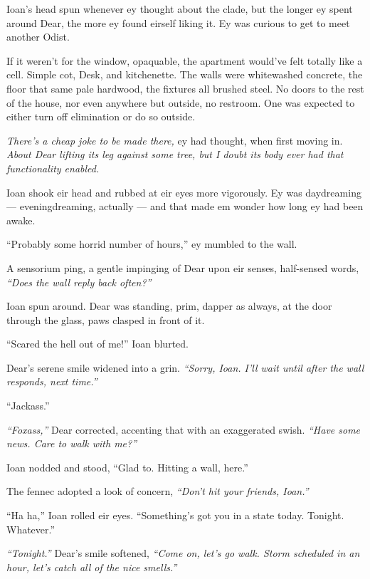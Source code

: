 Ioan's head spun whenever ey thought about the clade, but the longer ey spent around Dear, the more ey found eirself liking it. Ey was curious to get to meet another Odist.

If it weren't for the window, opaquable, the apartment would've felt totally like a cell. Simple cot, Desk, and kitchenette. The walls were whitewashed concrete, the floor that same pale hardwood, the fixtures all brushed steel. No doors to the rest of the house, nor even anywhere but outside, no restroom. One was expected to either turn off elimination or do so outside.

\emph{There's a cheap joke to be made there,} ey had thought, when first moving in. \emph{About Dear lifting its leg against some tree, but I doubt its body ever had that functionality enabled.}

Ioan shook eir head and rubbed at eir eyes more vigorously. Ey was daydreaming --- eveningdreaming, actually --- and that made em wonder how long ey had been awake.

``Probably some horrid number of hours,'' ey mumbled to the wall.

A sensorium ping, a gentle impinging of Dear upon eir senses, half-sensed words, \emph{``Does the wall reply back often?''}

Ioan spun around. Dear was standing, prim, dapper as always, at the door through the glass, paws clasped in front of it.

``Scared the hell out of me!'' Ioan blurted.

Dear's serene smile widened into a grin. \emph{``Sorry, Ioan. I'll wait until after the wall responds, next time.''}

``Jackass.''

\emph{``Foxass,''} Dear corrected, accenting that with an exaggerated swish. \emph{``Have some news. Care to walk with me?''}

Ioan nodded and stood, ``Glad to. Hitting a wall, here.''

The fennec adopted a look of concern, \emph{``Don't hit your friends, Ioan.''}

``Ha ha,'' Ioan rolled eir eyes. ``Something's got you in a state today. Tonight. Whatever.''

\emph{``Tonight.''} Dear's smile softened, \emph{``Come on, let's go walk. Storm scheduled in an hour, let's catch all of the nice smells.''}
